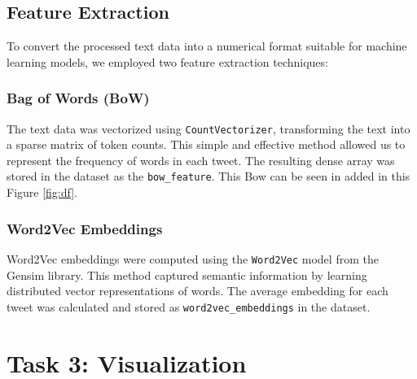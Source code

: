 \documentclass[a4paper,11pt]{article}
\begin{document}
\subsection{Feature Extraction}
To convert the processed text data into a numerical format suitable for machine learning models, we employed two feature extraction techniques:

\subsubsection{Bag of Words (BoW)}
The text data was vectorized using \texttt{CountVectorizer}, transforming the text into a sparse matrix of token counts. This simple and effective method allowed us to represent the frequency of words in each tweet. The resulting dense array was stored in the dataset as the \texttt{bow\_feature}. This Bow can be seen in added in this Figure \ref{fig:df}.

\subsubsection{Word2Vec Embeddings}
Word2Vec embeddings were computed using the \texttt{Word2Vec} model from the Gensim library. This method captured semantic information by learning distributed vector representations of words. The average embedding for each tweet was calculated and stored as \texttt{word2vec\_embeddings} in the dataset.

\section{Task 3: Visualization}
\end{document}
